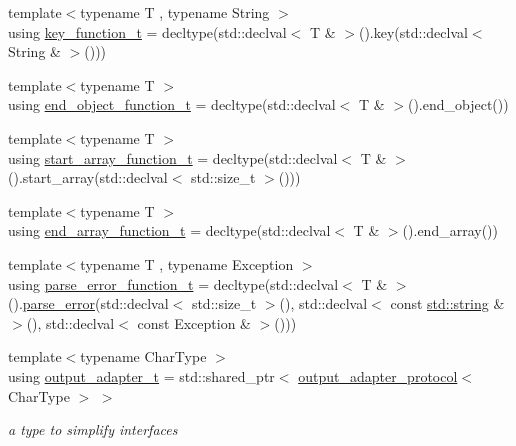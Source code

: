 \begin{DoxyCompactItemize}
\item 
{\footnotesize template$<$typename T , typename String $>$ }\\using \mbox{\hyperlink{namespacenlohmann_1_1detail_a44869ca9f422b260625d78e4e8121559}{key\+\_\+function\+\_\+t}} = decltype(std\+::declval$<$ T \& $>$().key(std\+::declval$<$ String \& $>$()))
\item 
{\footnotesize template$<$typename T $>$ }\\using \mbox{\hyperlink{namespacenlohmann_1_1detail_af52d6d2521c386998ae940d118182ebc}{end\+\_\+object\+\_\+function\+\_\+t}} = decltype(std\+::declval$<$ T \& $>$().end\+\_\+object())
\item 
{\footnotesize template$<$typename T $>$ }\\using \mbox{\hyperlink{namespacenlohmann_1_1detail_a80273cecc45765d7b2826ec931fbffdd}{start\+\_\+array\+\_\+function\+\_\+t}} = decltype(std\+::declval$<$ T \& $>$().start\+\_\+array(std\+::declval$<$ std\+::size\+\_\+t $>$()))
\item 
{\footnotesize template$<$typename T $>$ }\\using \mbox{\hyperlink{namespacenlohmann_1_1detail_aec53c029383b34a72182210e58fadb79}{end\+\_\+array\+\_\+function\+\_\+t}} = decltype(std\+::declval$<$ T \& $>$().end\+\_\+array())
\item 
{\footnotesize template$<$typename T , typename Exception $>$ }\\using \mbox{\hyperlink{namespacenlohmann_1_1detail_a264d4d58bc1fd82bcc7bf6bf73d6acad}{parse\+\_\+error\+\_\+function\+\_\+t}} = decltype(std\+::declval$<$ T \& $>$().\mbox{\hyperlink{classnlohmann_1_1detail_1_1parse__error}{parse\+\_\+error}}(std\+::declval$<$ std\+::size\+\_\+t $>$(), std\+::declval$<$ const \mbox{\hyperlink{namespacenlohmann_1_1detail_a1ed8fc6239da25abcaf681d30ace4985ab45cffe084dd3d20d928bee85e7b0f21}{std\+::string}} \& $>$(), std\+::declval$<$ const Exception \& $>$()))
\item 
{\footnotesize template$<$typename Char\+Type $>$ }\\using \mbox{\hyperlink{namespacenlohmann_1_1detail_a9b680ddfb58f27eb53a67229447fc556}{output\+\_\+adapter\+\_\+t}} = std\+::shared\+\_\+ptr$<$ \mbox{\hyperlink{structnlohmann_1_1detail_1_1output__adapter__protocol}{output\+\_\+adapter\+\_\+protocol}}$<$ Char\+Type $>$ $>$
\begin{DoxyCompactList}\small\item\em a type to simplify interfaces \end{DoxyCompactList}\end{DoxyCompactItemize}
